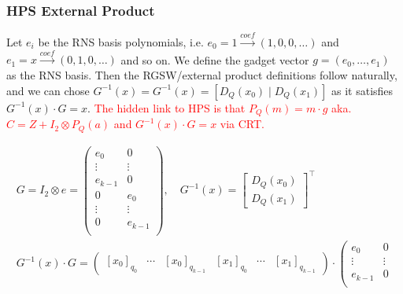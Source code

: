 \subsubsection{HPS External Product}
Let $e_i$ be the RNS basis polynomials, i.e. $e_0 = 1 \overset{coef}{\to} (1, 0, 0, \dots )$ and $e_1 = x \overset{coef}{\to} (0, 1, 0, \dots )$ and so on. We define the gadget vector $g = (e_0, \dots, e_1)$ as the RNS basis. Then the RGSW/external product definitions follow naturally, and we can chose $G^{-1}(x) = G^{-1}(x) = [D_Q(x_0) \;|\; D_Q(x_1)]$ as it satisfies $G^{-1}(x)\cdot G = x$. \textcolor{red}{The hidden link to HPS is that $P_Q(m) = m\cdot g$ aka. $C = Z + I_2\otimes P_Q(a)$ and $G^{-1}(x)\cdot G = x$ via CRT.}

    \begin{gather*}
        G = I_2\otimes e = \left(
        \begin{array}{c|c}
             e_0 & 0  \\
             \vdots & \vdots \\
             e_{k-1} & 0 \\
             \hline
             0 & e_0 \\
             \vdots & \vdots \\
             0 & e_{k-1} \\
        \end{array}
        \right), \quad
        G^{-1}(x) = 
        \begin{bmatrix}
            D_Q(x_0) \\ D_Q(x_1)
        \end{bmatrix}^\intercal
    \\
        G^{-1}(x)\cdot G = 
        \left(
        \begin{array}{ccc|ccc}
            [x_0]_{q_0} & \cdots & [x_0]_{q_{k-1}} & [x_1]_{q_0} & \cdots & [x_1]_{q_{k-1}}
        \end{array}
        \right) \cdot \left(
        \begin{array}{c|c}
             e_0 & 0  \\
             \vdots & \vdots \\
             e_{k-1} & 0 \\

\end{array}
\end{gather*}
